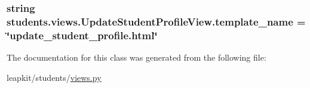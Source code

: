 \hypertarget{classstudents_1_1views_1_1_update_student_profile_view_a0104ec1afe309e798042732c2b9e4e41}{
\subsubsection[{template\-\_\-name}]{\setlength{\rightskip}{0pt plus 5cm}string students.\-views.\-Update\-Student\-Profile\-View.\-template\-\_\-name = \char`\"{}update\-\_\-student\-\_\-profile.\-html\char`\"{}\hspace{0.3cm}{\ttfamily [static]}}}\label{classstudents_1_1views_1_1_update_student_profile_view_a0104ec1afe309e798042732c2b9e4e41}


The documentation for this class was generated from the following file\-:\begin{DoxyCompactItemize}
\item 
leapkit/students/\hyperlink{views_8py}{views.\-py}\end{DoxyCompactItemize}
